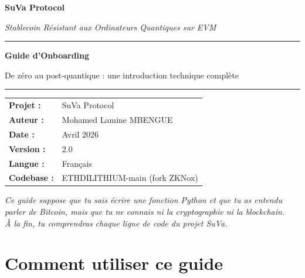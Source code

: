 \documentclass[11pt,a4paper]{article}
\begin{document}

\begin{titlepage}
\centering
\vspace*{2cm}
{\Huge\bfseries\textcolor{suva-blue}{SuVa Protocol}\par}
\vspace{0.5cm}
{\Large\textit{Stablecoin Résistant aux Ordinateurs Quantiques sur EVM}\par}
\vspace{1.5cm}
\rule{\linewidth}{0.5pt}
\vspace{0.5cm}
{\LARGE\bfseries Guide d'Onboarding\par}
\vspace{0.3cm}
{\large De zéro au post-quantique : une introduction technique complète\par}
\vspace{0.5cm}
\rule{\linewidth}{0.5pt}
\vspace{2cm}

\begin{tabular}{ll}
\textbf{Projet :}   & SuVa Protocol \\[4pt]
\textbf{Auteur :}   & Mohamed Lamine MBENGUE \\[4pt]
\textbf{Date :}     & Avril 2026 \\[4pt]
\textbf{Version :}  & 2.0 \\[4pt]
\textbf{Langue :}   & Français \\[4pt]
\textbf{Codebase :} & ETHDILITHIUM-main (fork ZKNox) \\
\end{tabular}

\vfill
\begin{tcolorbox}[enhanced,colback=suva-blue!8,colframe=suva-blue,arc=4mm]
\centering\textit{Ce guide suppose que tu sais écrire une fonction Python et que tu as entendu\\
parler de Bitcoin, mais que tu ne connais ni la cryptographie ni la blockchain.\\
À la fin, tu comprendras chaque ligne de code du projet SuVa.}
\end{tcolorbox}
\end{titlepage}

\tableofcontents
\newpage

\section*{Comment utiliser ce guide}
\end{document}
